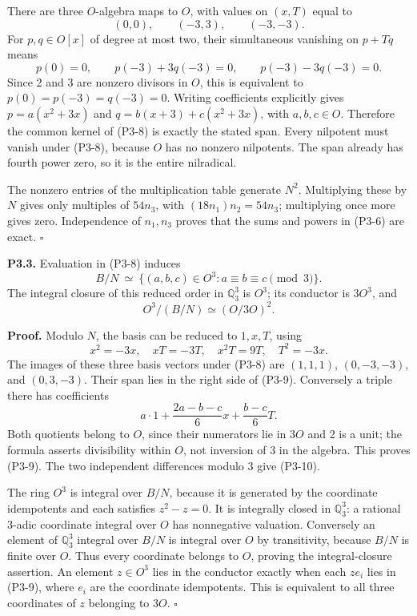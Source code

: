 \documentclass[
]{article}
\begin{document}
There are three \(O\)-algebra maps to \(O\), with values on \((x,T)\)
equal to \[
(0,0),\qquad(-3,3),\qquad(-3,-3).
\tag{P3-8}
\] For \(p,q\in O[x]\) of degree at most two, their simultaneous
vanishing on \(p+Tq\) means \[
p(0)=0,\qquad p(-3)+3q(-3)=0,\qquad
p(-3)-3q(-3)=0.
\] Since 2 and 3 are nonzero divisors in \(O\), this is equivalent to
\(p(0)=p(-3)=q(-3)=0\). Writing coefficients explicitly gives
\(p=a(x^2+3x)\) and \(q=b(x+3)+c(x^2+3x)\), with \(a,b,c\in O\).
Therefore the common kernel of (P3-8) is exactly the stated span. Every
nilpotent must vanish under (P3-8), because \(O\) has no nonzero
nilpotents. The span already has fourth power zero, so it is the entire
nilradical.

The nonzero entries of the multiplication table generate \(N^2\).
Multiplying these by \(N\) gives only multiples of \(54n_3\), with
\((18n_1)n_2=54n_3\); multiplying once more gives zero. Independence of
\(n_1,n_3\) proves that the sums and powers in (P3-6) are exact.
\(\square\)

\textbf{P3.3.} Evaluation in (P3-8) induces \[
B/N\ \simeq\ \{(a,b,c)\in O^3:a\equiv b\equiv c\pmod3\}.
\tag{P3-9}
\] The integral closure of this reduced order in \(\mathbb Q_3^3\) is
\(O^3\); its conductor is \(3O^3\), and \[
O^3/(B/N)\simeq (O/3O)^2.
\tag{P3-10}
\]

\textbf{Proof.} Modulo \(N\), the basis can be reduced to \(1,x,T\),
using \[
x^2=-3x,\quad xT=-3T,\quad x^2T=9T,\quad T^2=-3x.
\] The images of these three basis vectors under (P3-8) are \((1,1,1)\),
\((0,-3,-3)\), and \((0,3,-3)\). Their span lies in the right side of
(P3-9). Conversely a triple there has coefficients \[
a\cdot1+\frac{2a-b-c}{6}x+\frac{b-c}{6}T.
\] Both quotients belong to \(O\), since their numerators lie in \(3O\)
and 2 is a unit; the formula asserts divisibility within \(O\), not
inversion of 3 in the algebra. This proves (P3-9). The two independent
differences modulo 3 give (P3-10).

The ring \(O^3\) is integral over \(B/N\), because it is generated by
the coordinate idempotents and each satisfies \(z^2-z=0\). It is
integrally closed in \(\mathbb Q_3^3\): a rational 3-adic coordinate
integral over \(O\) has nonnegative valuation. Conversely an element of
\(\mathbb Q_3^3\) integral over \(B/N\) is integral over \(O\) by
transitivity, because \(B/N\) is finite over \(O\). Thus every
coordinate belongs to \(O\), proving the integral-closure assertion. An
element \(z\in O^3\) lies in the conductor exactly when each \(ze_i\)
lies in (P3-9), where \(e_i\) are the coordinate idempotents. This is
equivalent to all three coordinates of \(z\) belonging to \(3O\).
\(\square\)
\end{document}
